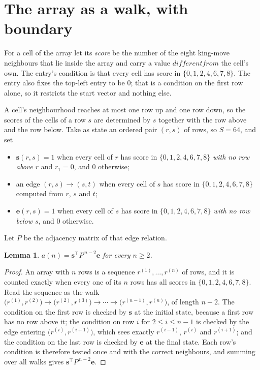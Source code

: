 \documentclass[11pt,a4paper]{article}
\theoremstyle{plain}
\newtheorem{lemma}[theorem]{Lemma}
\theoremstyle{definition}
\begin{document}
\section{The array as a walk, with boundary}

For a cell of the array let its \emph{score} be the number of the eight king-move neighbours that lie inside
the array and carry a value $different from$ the cell's own. The entry's condition is that every cell
has score in $\{0,1,2,4,6,7,8\}$. The entry also fixes the top-left entry to be $0$; that is a condition on the first row alone, so it restricts the start vector and nothing else.

A cell's neighbourhood reaches at most one row up and one row down, so the scores of the
cells of a row $s$ are determined by $s$ together with the row above and the row below.
Take as state an ordered pair $(r,s)$ of rows, so $S=64$, and set
\begin{itemize}
\item $\mathbf{s}(r,s)=1$ when every cell of $r$ has score in $\{0,1,2,4,6,7,8\}$ \emph{with no row
above $r$} and $r_1=0$, and $0$ otherwise;
\item an edge $(r,s)\to(s,t)$ when every cell of $s$ has score in $\{0,1,2,4,6,7,8\}$ computed from
$r$, $s$ and $t$;
\item $\mathbf{e}(r,s)=1$ when every cell of $s$ has score in $\{0,1,2,4,6,7,8\}$ \emph{with no row
below $s$}, and $0$ otherwise.
\end{itemize}
Let $P$ be the adjacency matrix of that edge relation.

\begin{lemma}\label{lem:walk}
$a(n)=\mathbf{s}^{\!\top}P^{\,n-2}\mathbf{e}$ for every $n\ge2$.
\end{lemma}

\begin{proof}
An array with $n$ rows is a sequence $r^{(1)},\dots,r^{(n)}$ of rows, and it is counted
exactly when every one of its $n$ rows has all scores in $\{0,1,2,4,6,7,8\}$. Read the sequence as the
walk $\bigl(r^{(1)},r^{(2)}\bigr)\to\bigl(r^{(2)},r^{(3)}\bigr)\to\cdots\to
\bigl(r^{(n-1)},r^{(n)}\bigr)$, of length $n-2$. The condition on the first row is
checked by $\mathbf{s}$ at the initial state, because a first row has no row above it; the
condition on row $i$ for $2\le i\le n-1$ is checked by the edge entering
$\bigl(r^{(i)},r^{(i+1)}\bigr)$, which sees exactly $r^{(i-1)}$, $r^{(i)}$ and
$r^{(i+1)}$; and the condition on the last row is checked by $\mathbf{e}$ at the final
state. Each row's condition is therefore tested once and with the correct neighbours, and
summing over all walks gives $\mathbf{s}^{\!\top}P^{\,n-2}\mathbf{e}$.
\end{proof}
\end{document}
